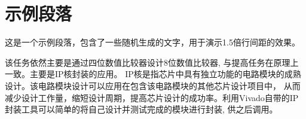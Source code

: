 \documentclass[12]{article}
\begin{document}
\section*{示例段落}

这是一个示例段落，包含了一些随机生成的文字，用于演示1.5倍行间距的效果。

该任务依然主要是通过四位数值比较器设计8位数值比较器, 与提高任务在原理上一致。主要是IP核封装的应用。
IP核是指芯片中具有独立功能的电路模块的成熟设计。该电路模块设计可以应用在包含该电路模块的其他芯片设计项目中，
从而减少设计工作量，缩短设计周期，提高芯片设计的成功率。利用Vivado自带的IP封装工具可以简单的将自己设计并测试完成的模块进行封装, 供之后调用。
\end{document}
